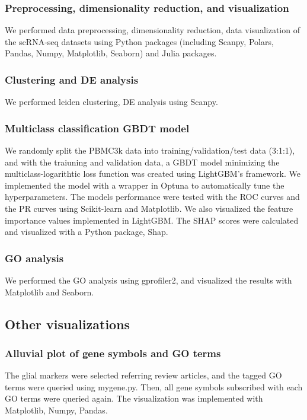 \documentclass{article}
\begin{document}
\subsubsection*{Preprocessing, dimensionality reduction, and visualization}
We performed data preprocessing, dimensionality reduction, data visualization
of the scRNA-seq datasets using Python packages (including Scanpy\cite{scanpy}, Polars,
Pandas\cite{pandas}, Numpy, Matplotlib\cite{matplotlib}, Seaborn\cite{seaborn}) and Julia packages.

\subsubsection*{Clustering and DE analysis}
We performed leiden clustering, DE analysis using Scanpy.

\subsubsection*{Multiclass classification GBDT model}
We randomly split the PBMC3k data into training/validation/test data (3:1:1), and with the traiuning and validation 
data, a GBDT model minimizing the multiclass-logarithtic loss function was created using LightGBM's 
framework. We implemented the model with a wrapper in Optuna to automatically tune the hyperparameters. The 
models performance were tested with the ROC curves and the PR curves using Scikit-learn and Matplotlib. We 
also visualized the feature importance values implemented in LightGBM. The SHAP scores were calculated and visualized 
with a Python package, Shap\cite{shap,shap_treeexplainer}.

\subsubsection*{GO analysis}
We performed the GO analysis using gprofiler2\cite{gprofiler2}, and visualized the results with Matplotlib and Seaborn.

\subsection*{Other visualizations}
\subsubsection*{Alluvial plot of gene symbols and GO terms}
The glial markers were selected referring review articles, and the tagged GO terms were queried using mygene.py. 
Then, all gene symbols subscribed with each GO terms were queried again. The visualization was implemented 
with Matplotlib, Numpy, Pandas.
\end{document}
